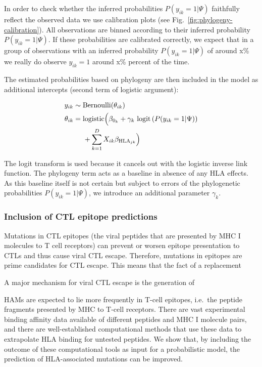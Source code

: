 \documentclass{bioinfo}
\begin{document}
\begin{methods}
In order to check whether the inferred probabilities \(P(y_{ik}=1|\Psi)\) faithfully reflect the observed data we use calibration plots (see Fig.~\ref{fig:phylogeny-calibration}). All observations are binned according to their inferred probability \(P(y_{ik}=1|\Psi)\). If these probabilities are calibrated correctly, we expect that in a group of observations with an inferred probability \(P(y_{ik}=1|\Psi)\) of around x\% we really do observe \(y_{ik}=1\) around x\% percent of the time.

The estimated probabilities based on phylogeny are then included in the model as additional intercepts (second term of logistic argument):

\begin{equation}
\begin{aligned}
  y_{ik}  & \sim \text{Bernoulli}(\theta_{ik}) \\
  \theta_{ik}  & =  \text{logistic}\Bigl(\beta_{0_{k}} + \gamma_k~\text{logit}\left(P(y_{ik}=1|\Psi)\right) \\
  &\;\;\;\;\; + \sum_{k=1}^{D}X_{ik}\beta_{\text{HLA}_{jk}}\Bigr)
  \label{eq:phylogeny}
\end{aligned}
\end{equation}


The logit transform is used because it cancels out with the logistic inverse link function. The phylogeny term acts as a baseline in absence of any HLA effects. As this baseline itself is not certain but subject to errors of the phylogenetic probabilities $P(y_{ik}=1|\Psi)$, we introduce an additional parameter $\gamma_k$.

\subsubsection{Inclusion of CTL epitope predictions}

Mutations in CTL epitopes (the viral peptides that are presented by MHC I molecules to T cell receptors) can prevent or worsen epitope presentation to CTLs and thus cause viral CTL escape. Therefore, mutations in epitopes are prime candidates for CTL escape. This means that the fact of a replacement 

A major mechanism for viral CTL escape is the generation of 

    HAMs are expected to lie more frequently in T-cell epitopes, i.e.\ the peptide fragments presented by MHC to T-cell receptors. There are vast experimental binding affinity data available of different peptides and MHC I molecule pairs, and there are well-established computational methods that use these data to extrapolate HLA binding for untested peptides. We show that, by including the outcome of these computational tools as input for a probabilistic model, the prediction of HLA-associated mutations can be improved.


\end{methods}
\end{document}
